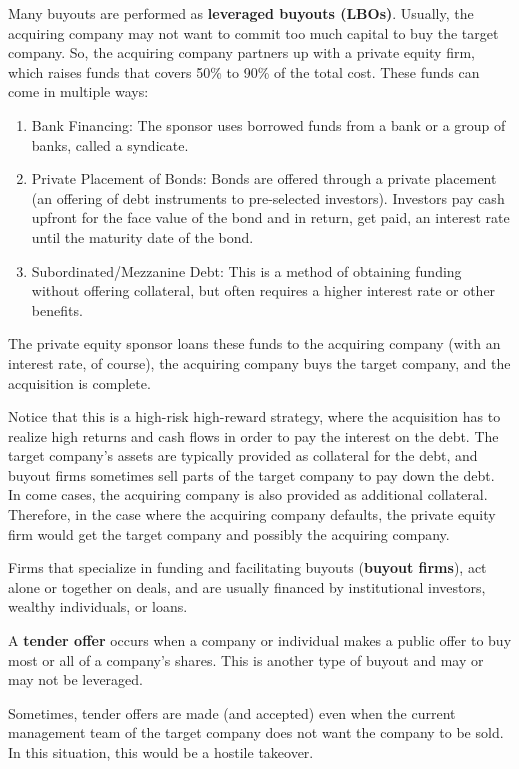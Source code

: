 \documentclass{article}
\begin{document}
    \begin{definition}
      Many buyouts are performed as \textbf{leveraged buyouts (LBOs)}. Usually, the acquiring company may not want to commit too much capital to buy the target company. So, the acquiring company partners up with a private equity firm, which raises funds that covers 50\% to 90\% of the total cost. These funds can come in multiple ways: 
      \begin{enumerate}
        \item Bank Financing: The sponsor uses borrowed funds from a bank or a group of banks, called a syndicate. 
        \item Private Placement of Bonds: Bonds are offered through a private placement (an offering of debt instruments to pre-selected investors). Investors pay cash upfront for the face value of the bond and in return, get paid, an interest rate until the maturity date of the bond. 
        \item Subordinated/Mezzanine Debt: This is a method of obtaining funding without offering collateral, but often requires a higher interest rate or other benefits. 
      \end{enumerate}
      The private equity sponsor loans these funds to the acquiring company (with an interest rate, of course), the acquiring company buys the target company, and the acquisition is complete. 

      Notice that this is a high-risk high-reward strategy, where the acquisition has to realize high returns and cash flows in order to pay the interest on the debt. The target company's assets are typically provided as collateral for the debt, and buyout firms sometimes sell parts of the target company to pay down the debt. In come cases, the acquiring company is also provided as additional collateral. Therefore, in the case where the acquiring company defaults, the private equity firm would get the target company and possibly the acquiring company. 

      Firms that specialize in funding and facilitating buyouts (\textbf{buyout firms}), act alone or together on deals, and are usually financed by institutional investors, wealthy individuals, or loans. 
    \end{definition}

    \begin{definition}
      A \textbf{tender offer} occurs when a company or individual makes a public offer to buy most or all of a company's shares. This is another type of buyout and may or may not be leveraged. 

      Sometimes, tender offers are made (and accepted) even when the current management team of the target company does not want the company to be sold. In this situation, this would be a hostile takeover. 
    \end{definition}
\end{document}

